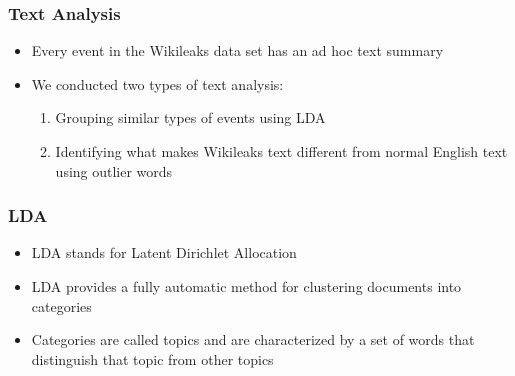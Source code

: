 \documentclass[xcolor=dvipsnames, 9pt]{beamer}
\begin{document}


\begin{frame}[fragile]
  \frametitle{Text Analysis}
  
  \begin{itemize}
    \item{Every event in the Wikileaks data set has an ad hoc text summary}
    \item{We conducted two types of text analysis:}
    \begin{enumerate}
      \item{Grouping similar types of events using LDA}
      \item{Identifying what makes Wikileaks text different from normal English text using outlier words}
    \end{enumerate}
  \end{itemize}
\end{frame}

\begin{frame}[fragile]
  \frametitle{LDA}
  \begin{itemize}
    \item{LDA stands for Latent Dirichlet Allocation}
    \item{LDA provides a fully automatic method for clustering documents into categories}
    \item{Categories are called topics and are characterized by a set of words that distinguish that topic from other topics}
  \end{itemize}
\end{frame}
\end{document}
